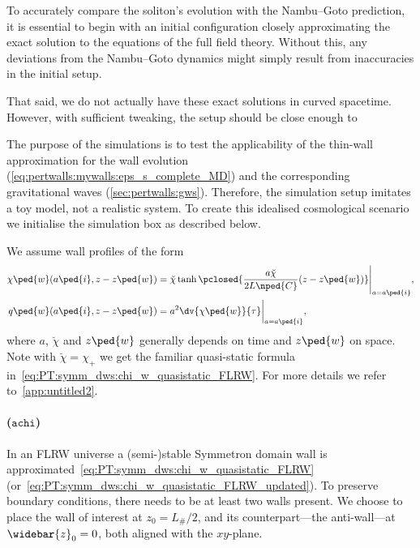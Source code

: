     To accurately compare the soliton's evolution with the Nambu--Goto prediction, it is essential to begin with an initial configuration closely approximating the exact solution to the equations of the full field theory. Without this, any deviations from the Nambu--Goto dynamics might simply result from inaccuracies in the initial setup.

    That said, we do not actually have these exact solutions in curved spacetime. However, with sufficient tweaking, the setup should be close enough to \blahblah

    The purpose of the simulations is to test the applicability of the thin-wall approximation for the wall evolution (\cref{eq:pertwalls:mywalls:eps_s_complete_MD}) and the corresponding gravitational waves (\cref{sec:pertwalls:gws}). Therefore, the simulation setup imitates a toy model, not a realistic system. To create this idealised cosmological scenario we initialise the simulation box as described below.


    We assume wall profiles of the form
    \begin{subequations}
        \begin{align}
            \chi\ped{w}(a\ped{i}, z- z\ped{w}) &= {\breve{\chi}\tanh{\pclosed{\frac{a\breve{\chi}}{2L\nped{C}} (z-z\ped{w}) }} }\Bigg|_{a=a\ped{i}}, \\
            q\ped{w}(a\ped{i}, z- z\ped{w}) &= a^2 \dv{\chi\ped{w}}{\tau}\bigg|_{a=a\ped{i}},
        \end{align}
    \end{subequations}
    where $a$, $\breve{\chi}$ and $z\ped{w}$ generally depends on time and $z\ped{w}$ on space. Note with $\breve{\chi}=\chi_+$ we get the familiar quasi-static formula in~\cref{eq:PT:symm_dws:chi_w_quasistatic_FLRW}. For more details we refer to~\cref{app:untitled2}.

    \paragraph{($\mathtt{achi}$)} %
    In an FLRW universe a (semi-)stable Symmetron domain wall is approximated~\cref{eq:PT:symm_dws:chi_w_quasistatic_FLRW} (or~\cref{eq:PT:symm_dws:chi_w_quasistatic_FLRW_updated}). To preserve boundary conditions, there needs to be at least two walls present. We choose to place the wall of interest at $z_0 = L_\#/2$, and its counterpart---the anti-wall---at $\widebar{z}_0=0$, both aligned with the $xy$-plane. %
    

